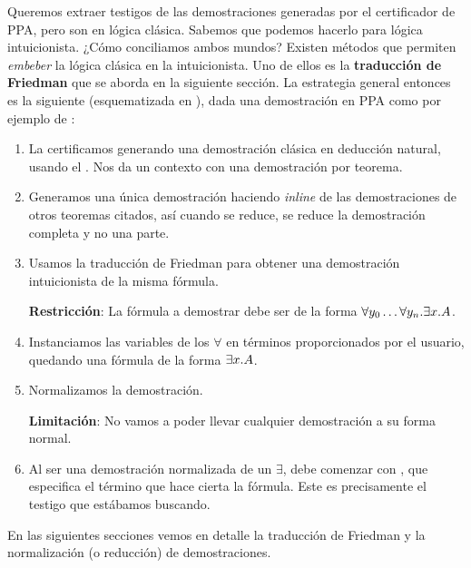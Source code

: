 Queremos extraer testigos de las demostraciones generadas por el certificador de
PPA, pero son en lógica clásica. Sabemos que podemos hacerlo para lógica
intuicionista. ¿Cómo conciliamos ambos mundos? Existen métodos que permiten
\textit{embeber} la lógica clásica en la intuicionista. Uno de ellos es la
\textbf{traducción de Friedman} que se aborda en la siguiente sección. La
estrategia general entonces es la siguiente (esquematizada en ), dada una demostración en PPA como
por ejemplo de :
\begin{enumerate}
    \item La certificamos generando una demostración clásica en deducción
    natural, usando el \modCertifier{}. Nos da un contexto con una demostración
    por teorema.
    \item Generamos una única demostración haciendo \textit{inline} de las demostraciones de otros teoremas citados, así cuando se reduce, se reduce la demostración completa y no una parte.
    \item Usamos la traducción de Friedman para obtener una demostración
    intuicionista de la misma fórmula.

    \textbf{Restricción}: La fórmula a demostrar debe ser de la forma
    $\forall y_0 \dots \forall y_n . \exists x . A$.
    \item Instanciamos las variables de los $\forall$ en términos proporcionados
    por el usuario, quedando una fórmula de la forma $\exists x . A$.
    \item Normalizamos la demostración.
    
    \textbf{Limitación}: No vamos a poder llevar cualquier demostración a su
    forma normal.

    \item Al ser una demostración normalizada de un $\exists$, debe comenzar con
    , que especifica el término que hace cierta la fórmula. Este
    es precisamente el testigo que estábamos buscando.

    \proofTreeExistsI
\end{enumerate}

En las siguientes secciones vemos en detalle la traducción de Friedman y la
normalización (o reducción) de demostraciones.

